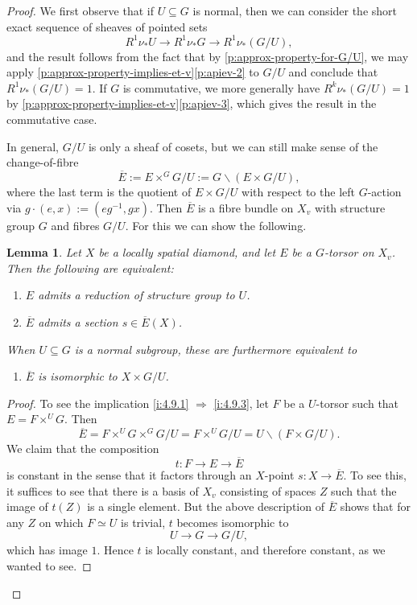 \documentclass[11pt]{amsart}
\numberwithin{equation}{section}
\newtheorem{Lemma}[thm]{Lemma}
\theoremstyle{definition}
\theoremstyle{remark}
\newcommand{\lra}{\longrightarrow}
\begin{document}
\begin{proof}
	We first observe that if $U\subseteq G$ is normal, then we can consider the short exact sequence of sheaves of pointed sets
	\[ R^1\nu_{\ast}U\lra  R^1\nu_{\ast}G\lra  R^1\nu_{\ast}(G/U),\]
	and the result follows from the fact that by \cref{p:approx-property-for-G/U}, we may apply \cref{p:approx-property-implies-et-v}\eqref{p:apiev-2} to $G/U$ and conclude that  $R^1\nu_{\ast}(G/U)=1$. If $G$ is commutative, we more generally have $R^k\nu_{\ast}(G/U)=1$ by \cref{p:approx-property-implies-et-v}\eqref{p:apiev-3}, which gives the result in the commutative case.
	
	In general, $G/U$ is only a sheaf of cosets, but we can still make sense of the change-of-fibre
	\[\overline{E}:=E\times^GG/U:=G\backslash(E\times G/U), \]
	where the last term is the quotient of $E\times G/U$ with respect to the left $G$-action via $g\cdot (e,x):=(eg^{-1},gx)$. Then $\overline{E}$ is a fibre bundle on $X_v$ with structure group $G$ and fibres $G/U$. For this we can show the following. 


	       \begin{Lemma}\label{l:section-of-fibre-bundle}
			Let $X$ be a locally spatial diamond, and let $E$ be a $G$-torsor on $X_v$. Then the following are equivalent: 
			\begin{enumerate}
				\item\label{i:4.9.1} $E$ admits a reduction of structure group to $U$.
				\item\label{i:4.9.3} $\overline{E}$ admits a section $s\in \overline{E}(X)$.
			\end{enumerate}
			When $U\subseteq G$ is a normal subgroup, these are furthermore equivalent to 
			
			\begin{enumerate}[resume]
			\item\label{i:4.9.2} $\overline{E}$ is isomorphic to $X\times G/U$.
			\end{enumerate}
		\end{Lemma}

	\begin{proof}
			To see the implication 	\eqref{i:4.9.1} $\Rightarrow$ \eqref{i:4.9.3}, let $F$ be a $U$-torsor such that $E=F\times^UG$. Then
			\[ \overline{E}=F\times^UG\times^GG/U=F\times^UG/U=U\backslash(F\times G/U).\]
			We claim that the composition
			\[ t\colon F\lra E\lra \overline{E}\]
			is constant in the sense that it factors through an $X$-point $s\colon X\to \overline{E}$. To see this, it suffices to see that there is a basis of $X_v$ consisting of spaces $Z$ such that the image of $t(Z)$ is a single element. But the above description of $\overline{E}$ shows that for any $Z$ on which $F\simeq U$ is trivial, $t$ becomes isomorphic to
			\[ U\lra G\lra G/U,\]
			which  has image $1$. Hence $t$ is locally constant, and therefore constant, as we wanted to see.
			

\end{proof}
\end{proof}
\end{document}
